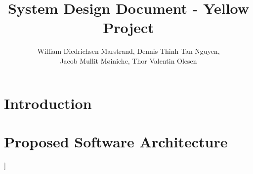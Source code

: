 \documentclass{article}
\title{System Design Document - Yellow Project}
\author{William Diedrichsen Marstrand, Dennis Thinh Tan Nguyen, 
\\Jacob Mullit Møiniche, Thor Valentin Olesen}
\begin{document}
\maketitle

\section{Introduction}
	
	
\section{Proposed Software Architecture}]
	
	
	
	
	
\end{document}

